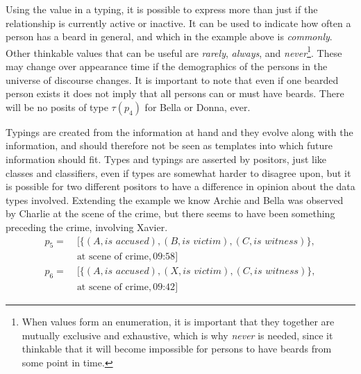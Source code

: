 \documentclass[sfsidenotes,nobib,twoside,symmetric]{tufte-handout}
\newcommand{\typeof}[1]{\tau(#1)}
\begin{document}
Using the value in a typing, it is possible to express more than just if the relationship is currently active or inactive. It can be used to indicate how often a person has a beard in general, and which in the example above is \emph{commonly}. Other thinkable values that can be useful are \emph{rarely}, \emph{always}, and \emph{never}\footnote{When values form an enumeration, it is important that they together are mutually exclusive and exhaustive, which is why \emph{never} is needed, since it thinkable that it will become impossible for persons to have beards from some point in time.}. These may change over appearance time if the demographics of the persons in the universe of discourse changes.  It is important to note that even if one bearded person exists it does not imply that all persons can or must have beards. There will be no posits of type $\typeof{p_{4}}$ for Bella or Donna, ever. 

Typings are created from the information at hand and they evolve along with the information, and should therefore not be seen as templates into which future information should fit. Types and typings are asserted by positors, just like classes and classifiers, even if types are somewhat harder to disagree upon, but it is possible for two different positors to have a difference in opinion about the data types involved. Extending the example we know Archie and Bella was observed by Charlie at the scene of the crime, but there seems to have been something preceding the crime, involving Xavier.
\begin{align*}
p_{5} =\;& [\{(A, \textit{is accused}), (B, \textit{is victim}), (C, \textit{is witness})\}, \\
&\textrm{at scene of crime}, \textrm{09:58}] \\
p_{6} =\;& [\{(A, \textit{is accused}), (X, \textit{is victim}), (C, \textit{is witness})\}, \\
&\textrm{at scene of crime}, \textrm{09:42}] 
\end{align*}
\end{document}
